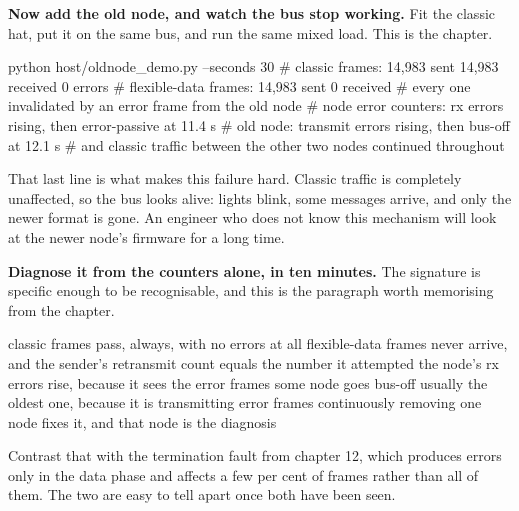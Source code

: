 \begin{steps}
\item \textbf{Now add the old node, and watch the bus stop working.} Fit the
classic hat, put it on the same bus, and run the same mixed load. This is the
chapter.
\begin{shellcode}
python host/oldnode_demo.py --seconds 30
# classic frames:        14,983 sent   14,983 received   0 errors
# flexible-data frames:   14,983 sent          0 received
#                        every one invalidated by an error frame from the old node
# node error counters:   rx errors rising, then error-passive at 11.4 s
# old node:              transmit errors rising, then bus-off at 12.1 s
# and classic traffic between the other two nodes continued throughout
\end{shellcode}
That last line is what makes this failure hard. Classic traffic is completely
unaffected, so the bus looks alive: lights blink, some messages arrive, and only
the newer format is gone. An engineer who does not know this mechanism will look
at the newer node's firmware for a long time.


\item \textbf{Diagnose it from the counters alone, in ten minutes.} The
signature is specific enough to be recognisable, and this is the paragraph worth
memorising from the chapter.
\begin{plaincode}
classic frames            pass, always, with no errors at all
flexible-data frames      never arrive, and the sender's retransmit count
                          equals the number it attempted
the node's rx errors      rise, because it sees the error frames
some node goes bus-off    usually the oldest one, because it is transmitting
                          error frames continuously
removing one node fixes   it, and that node is the diagnosis
\end{plaincode}
Contrast that with the termination fault from chapter 12, which produces errors
only in the data phase and affects a few per cent of frames rather than all of
them. The two are easy to tell apart once both have been seen.


\end{steps}
